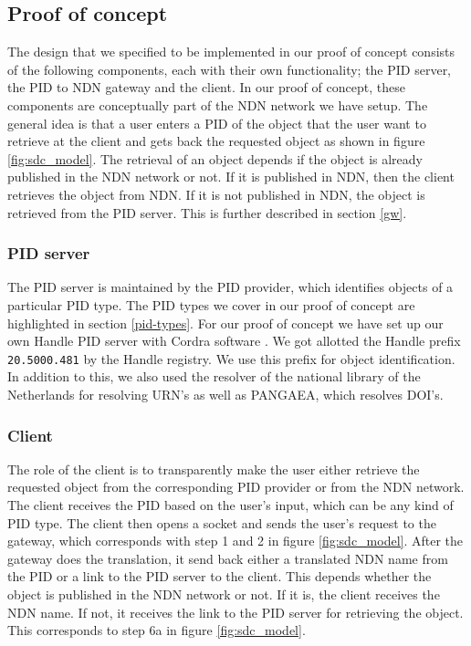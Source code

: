 \subsection{Proof of concept}
The design that we specified to be implemented in our proof of concept consists of the following components, each with their own functionality; the PID server, the PID to NDN gateway and the client. In our proof of concept, these components are conceptually part of the NDN network we have setup. The general idea is that a user enters a PID of the object that the user want to retrieve at the client and gets back the requested object as shown in figure \ref{fig:sdc_model}. The retrieval of an object depends if the object is already published in the NDN network or not. If it is published in NDN, then the client retrieves the object from NDN. If it is not published in NDN, the object is retrieved from the PID server. This is further described in section \ref{gw}.  

\subsubsection{PID server}
The PID server is maintained by the PID provider, which identifies objects of a particular PID type. The PID types we cover in our proof of concept are highlighted in section \ref{pid-types}. For our proof of concept we have set up our own Handle PID server with Cordra software \cite{cor}. We got allotted the Handle prefix \texttt{20.5000.481} by the Handle registry. We use this prefix for object identification. In addition to this, we also used the resolver of the national library of the Netherlands for resolving URN's as well as PANGAEA, which resolves DOI's.

\subsubsection{Client}\label{client}
The role of the client is to transparently make the user either retrieve the requested object from the corresponding PID provider or from the NDN network. The client receives the PID based on the user's input, which can be any kind of PID type. The client then opens a socket and sends the user's request to the gateway, which corresponds with step 1 and 2 in figure \ref{fig:sdc_model}. After the gateway does the translation, it send back either a translated NDN name from the PID or a link to the PID server to the client. This depends whether the object is published in the NDN network or not. If it is, the client receives the NDN name. If not, it receives the link to the PID server for retrieving the object. This corresponds to step 6a in figure \ref{fig:sdc_model}.

